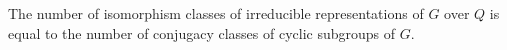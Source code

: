 The number of isomorphism classes of irreducible representations of $G$ over $Q$ is equal to the number of conjugacy classes of cyclic subgroups of $G$.